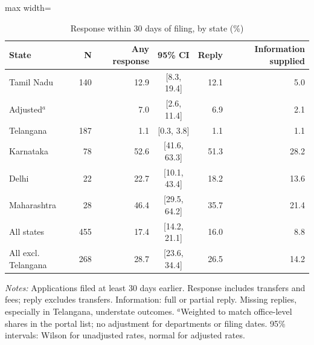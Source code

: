 \begin{table}[!htbp]
\centering
\caption{Response within 30 days of filing, by state (\%)}
\label{tab:tab_response_state}
\small
\begin{adjustbox}{max width=\textwidth}
\begin{threeparttable}
\begin{tabular}{lrrcrr}
\toprule
State & N & Any response & 95\% CI & Reply & Information supplied \\
\midrule
Tamil Nadu & 140 & 12.9 & [8.3, 19.4] & 12.1 & 5.0 \\
\quad Adjusted$^a$ &  & 7.0 & [2.6, 11.4] & 6.9 & 2.1 \\
Telangana & 187 & 1.1 & [0.3, 3.8] & 1.1 & 1.1 \\
Karnataka & 78 & 52.6 & [41.6, 63.3] & 51.3 & 28.2 \\
Delhi & 22 & 22.7 & [10.1, 43.4] & 18.2 & 13.6 \\
Maharashtra & 28 & 46.4 & [29.5, 64.2] & 35.7 & 21.4 \\
\midrule
All states & 455 & 17.4 & [14.2, 21.1] & 16.0 & 8.8 \\
All excl. Telangana & 268 & 28.7 & [23.6, 34.4] & 26.5 & 14.2 \\
\bottomrule
\end{tabular}
\begin{tablenotes}[flushleft]\footnotesize
\item \textit{Notes:} Applications filed at least 30 days earlier. Response includes transfers and fees; reply excludes transfers. Information: full or partial reply. Missing replies, especially in Telangana, understate outcomes. $^a$Weighted to match office-level shares in the portal list; no adjustment for departments or filing dates. 95\% intervals: Wilson for unadjusted rates, normal for adjusted rates.
\end{tablenotes}
\end{threeparttable}
\end{adjustbox}
\end{table}

